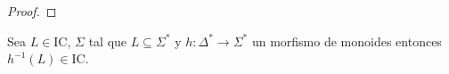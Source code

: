 \documentclass[tesis.tex]{subfiles}
\begin{document}
\begin{proof}
		
%		
%		
%		
		
\end{proof}


\begin{prop}
	Sea $L \in \text{IC}$, $\Sigma$ tal que $L \subseteq \Sigma^{*}$ y $h:\Delta^{*} \to \Sigma^*$ un morfismo de monoides 
	entonces $h^{-1}(L) \in \text{IC}$.
\end{prop}
\end{document}
